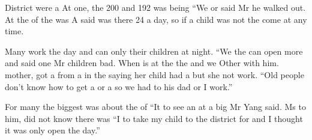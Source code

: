 \begin{lessonbody}
District  were a   At one, the   200 and  192 was  being  “We   or   said Mr   he walked out. At  the  of the   was  A  said  was there 24  a day, so if a child was not  the    come at any time.

Many  work  the day and can only  their children at night. “We  the  can open more  and    said one  Mr   children   bad. When  is  at the  the   and we  Other   with him.  mother,  got a  from a  in the  saying her child had a  but she  not  work. “Old people don’t  know how to get a  or a   so we had to   his dad or I  work.”

For many  the biggest  was about the  of  “It   to see an  at a big  Mr Yang said. Ms   to him,  did not know there was   “I  to take my child to the district  for  and I  thought it was only open  the day.”


\end{lessonbody}
